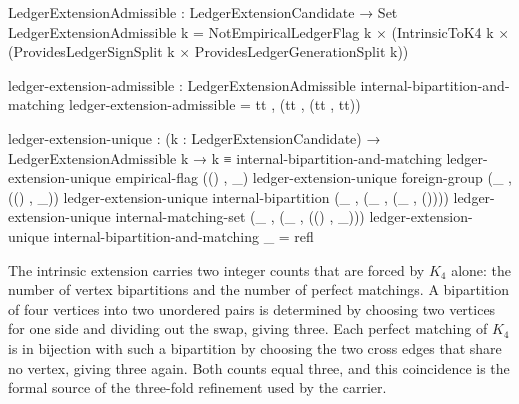 \documentclass[11pt]{article}
\begin{document}
\begin{code}
LedgerExtensionAdmissible : LedgerExtensionCandidate → Set
LedgerExtensionAdmissible k =
  NotEmpiricalLedgerFlag k ×
  (IntrinsicToK4 k ×
   (ProvidesLedgerSignSplit k × ProvidesLedgerGenerationSplit k))

ledger-extension-admissible :
  LedgerExtensionAdmissible internal-bipartition-and-matching
ledger-extension-admissible = tt , (tt , (tt , tt))

ledger-extension-unique :
  (k : LedgerExtensionCandidate) →
  LedgerExtensionAdmissible k →
  k ≡ internal-bipartition-and-matching
ledger-extension-unique empirical-flag                    (() , _)
ledger-extension-unique foreign-group                     (_ , (() , _))
ledger-extension-unique internal-bipartition              (_ , (_ , (_ , ())))
ledger-extension-unique internal-matching-set             (_ , (_ , (() , _)))
ledger-extension-unique internal-bipartition-and-matching _ = refl
\end{code}

The intrinsic extension carries two integer counts that are forced by
$K_4$ alone: the number of vertex bipartitions and the number of
perfect matchings.  A bipartition of four vertices into two unordered
pairs is determined by choosing two vertices for one side and dividing
out the swap, giving three.  Each perfect matching of $K_4$ is in
bijection with such a bipartition by choosing the two cross edges that
share no vertex, giving three again.  Both counts equal three, and
this coincidence is the formal source of the three-fold refinement
used by the carrier.

\end{document}
